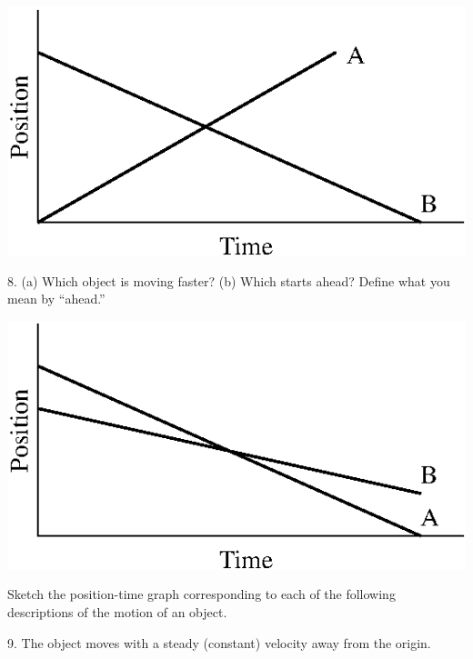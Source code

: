 \vspace{0.3cm}
{\par\raggedright \includegraphics{position/position_fig11.eps} \par}
\vspace{0.3cm}

8. (a) Which object is moving faster? (b) Which starts ahead? Define what you
mean by ``ahead.''


\vspace{0.3cm}
{\par\raggedright \includegraphics{position/position_fig12.eps} \par}
\vspace{0.3cm}

Sketch the position-time graph corresponding to each of the following descriptions
of the motion of an object.

9. The object moves with a steady (constant) velocity away from the origin.

